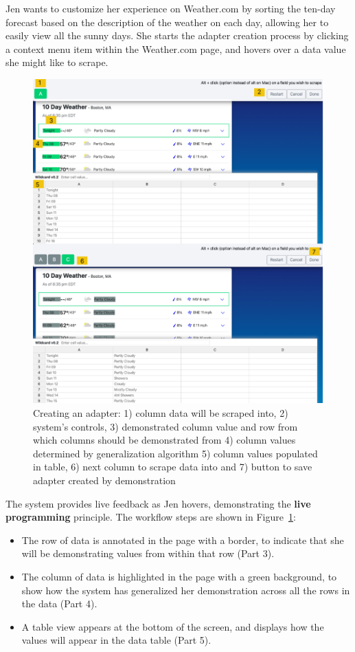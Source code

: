 \documentclass[sigconf,10pt]{acmart}
\providecommand{\tightlist}{%
  \setlength{\itemsep}{0pt}\setlength{\parskip}{0pt}}
\begin{document}
Jen wants to customize her experience on Weather.com by sorting the
ten-day forecast based on the description of the weather on each day,
allowing her to easily view all the sunny days. She starts the adapter
creation process by clicking a context menu item within the Weather.com
page, and hovers over a data value she might like to scrape.

\begin{figure}
  \includegraphics[width=\textwidth]{media/creating.png}
  \caption{\label{fig:creating} Creating an adapter: 1) column data will be scraped into, 2) system's controls, 3) demonstrated column value and row from which columns should be demonstrated from 4) column values determined by generalization algorithm 5) column values populated in table, 6) next column to scrape data into and 7) button to save adapter created by demonstration}
\end{figure}

The system provides live feedback as Jen hovers, demonstrating the
\textbf{live programming} principle. The workflow steps are shown in
Figure~\ref{fig:creating}:

\begin{itemize}
\tightlist
\item
  The row of data is annotated in the page with a border, to indicate
  that she will be demonstrating values from within that row (Part 3).
\item
  The column of data is highlighted in the page with a green background,
  to show how the system has generalized her demonstration across all
  the rows in the data (Part 4).
\item
  A table view appears at the bottom of the screen, and displays how the
  values will appear in the data table (Part 5).
\end{itemize}
\end{document}
